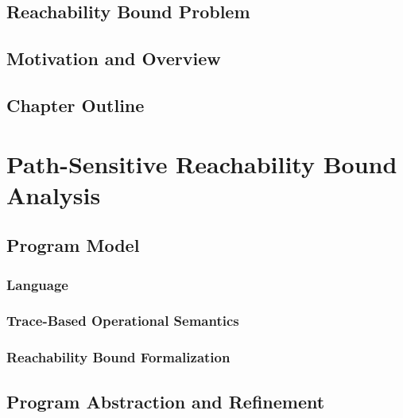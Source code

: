 \documentclass[12pt, letterpaper]{report}   %
\begin{document}
\section{Reachability Bound Problem}
\label{sec:reachability-background}

\section{Motivation and Overview}
\label{sec:reachability-motivation}

\section{Chapter Outline}
\label{sec:reachability-outline}

\chapter{Path-Sensitive Reachability Bound Analysis}
\label{sec:reachability-analysis}

\section{{Program Model}}
\label{sec:language}
\subsection{Language}
\subsection{Trace-Based Operational Semantics}
% 
\subsection{{Reachability Bound Formalization}}
\label{sec:execution_rb}
% 
% 
\section{Program Abstraction and Refinement}
\label{sec:reachability-program_refine}
\end{document}
